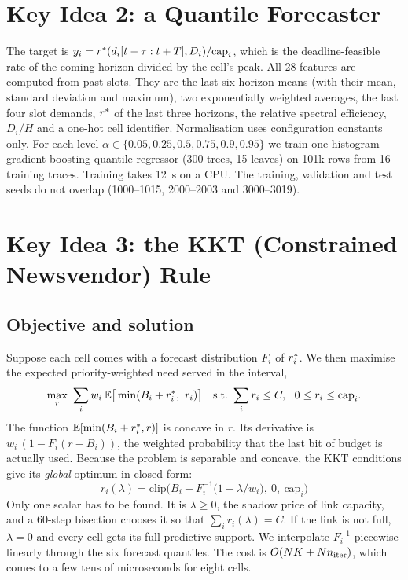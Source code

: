\section{Key Idea 2: a Quantile Forecaster}
\label{sec:gbm}

The target is $y_i = r^{\ast}(d_i[t-\tau : t+T], D_i)/\mathrm{cap}_i$, which is the deadline-feasible rate of the coming horizon divided by the cell's peak. All 28 features are computed from past slots. They are the last six horizon means (with their mean, standard deviation and maximum), two exponentially weighted averages, the last four slot demands, $r^{\ast}$ of the last three horizons, the relative spectral efficiency, $D_i/H$ and a one-hot cell identifier. Normalisation uses configuration constants only. For each level $\alpha \in \{0.05, 0.25, 0.5, 0.75, 0.9, 0.95\}$ we train one histogram gradient-boosting quantile regressor (300 trees, 15 leaves) on 101k rows from 16 training traces. Training takes 12~s on a CPU. The training, validation and test seeds do not overlap (1000--1015, 2000--2003 and 3000--3019).

\section{Key Idea 3: the KKT (Constrained Newsvendor) Rule}
\label{sec:kkt}

\subsection{Objective and solution}

Suppose each cell comes with a forecast distribution $F_i$ of $r^{\ast}_i$. We then maximise the expected priority-weighted need served in the interval,
\begin{equation}
  \max_{r}\ \sum_i w_i\,\mathbb{E}\big[\min(B_i + r^{\ast}_i,\ r_i)\big]
  \quad \text{s.t.}\ \sum_i r_i \le C,\ \ 0\le r_i\le \mathrm{cap}_i .
  \label{eq:nv}
\end{equation}
The function $\mathbb{E}[\min(B_i + r^{\ast}_i, r)]$ is concave in $r$. Its derivative is $w_i\,(1 - F_i(r - B_i))$, the weighted probability that the last bit of budget is actually used. Because the problem is separable and concave, the KKT conditions give its \emph{global} optimum in closed form:
\begin{equation}
  \boxed{\; r_i(\lambda) = \mathrm{clip}\Big(B_i + F_i^{-1}\big(1 - \lambda/w_i\big),\ 0,\ \mathrm{cap}_i\Big)\;}
  \label{eq:kkt}
\end{equation}
Only one scalar has to be found. It is $\lambda \ge 0$, the shadow price of link capacity, and a 60-step bisection chooses it so that $\sum_i r_i(\lambda) = C$. If the link is not full, $\lambda = 0$ and every cell gets its full predictive support. We interpolate $F_i^{-1}$ piecewise-linearly through the six forecast quantiles. The cost is $O(NK + N n_{\rm iter})$, which comes to a few tens of microseconds for eight cells.

